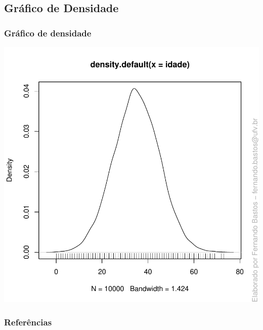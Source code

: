 \documentclass[14pt,aspectratio=1610]{beamer}
\begin{document}
\subsection{Gráfico de Densidade}
\begin{frame}{}
\frametitle{Gráfico de densidade}
\begin{block}{}
\begin{center}
\includegraphics{Aula5-idade2}
\end{center}
\end{block}
\end{frame}


\begin{frame}%
\frametitle{\bf Referências}

\end{frame}
\end{document}
